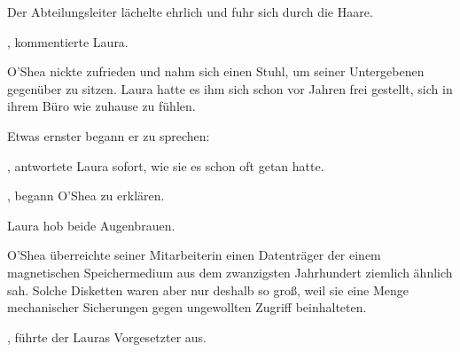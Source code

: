 \par

Der Abteilungsleiter lächelte ehrlich und fuhr sich durch die Haare. 

\par

, kommentierte Laura.

\par

O’Shea nickte zufrieden und nahm sich einen Stuhl, um seiner Untergebenen gegenüber zu sitzen. Laura hatte es ihm sich schon vor Jahren frei gestellt, sich in ihrem Büro wie zuhause zu fühlen.

\par

Etwas ernster begann er zu sprechen: 

\par

, antwortete Laura sofort, wie sie es schon oft getan hatte.

\par

, begann O’Shea zu erklären. 

\par

Laura hob beide Augenbrauen. 

\par

O'Shea überreichte seiner Mitarbeiterin einen Datenträger der einem magnetischen Speichermedium aus dem zwanzigsten Jahrhundert ziemlich ähnlich sah. Solche Disketten waren aber nur deshalb so groß, weil sie eine Menge mechanischer Sicherungen gegen ungewollten Zugriff beinhalteten.

\par

, führte der Lauras Vorgesetzter aus. 

\par

